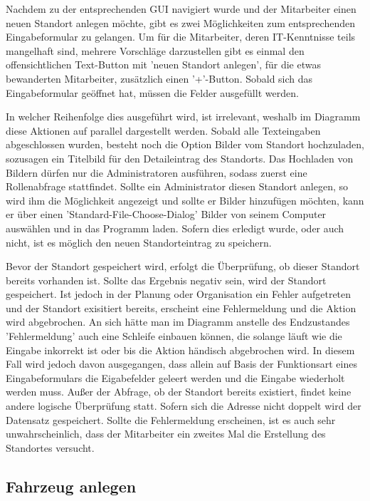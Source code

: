 Nachdem zu der entsprechenden GUI navigiert wurde und der Mitarbeiter einen neuen Standort anlegen möchte, gibt es zwei Möglichkeiten zum entsprechenden Eingabeformular zu gelangen. Um für die Mitarbeiter, deren IT-Kenntnisse teils mangelhaft sind, mehrere Vorschläge darzustellen gibt es einmal den offensichtlichen Text-Button mit 'neuen Standort anlegen', für die etwas bewanderten Mitarbeiter, zusätzlich einen '+'-Button. Sobald sich das Eingabeformular geöffnet hat, müssen die Felder ausgefüllt werden. 


In welcher Reihenfolge dies ausgeführt wird, ist irrelevant, weshalb im Diagramm diese Aktionen auf parallel dargestellt werden. Sobald alle Texteingaben abgeschlossen wurden, besteht noch die Option Bilder vom Standort hochzuladen, sozusagen ein Titelbild für den Detaileintrag des Standorts. Das Hochladen von Bildern dürfen nur die Administratoren ausführen, sodass zuerst eine Rollenabfrage stattfindet. Sollte ein Administrator diesen Standort anlegen, so wird ihm die Möglichkeit angezeigt und sollte er Bilder hinzufügen möchten, kann er über einen 'Standard-File-Choose-Dialog' Bilder von seinem Computer auswählen und in das Programm laden. Sofern dies erledigt wurde, oder auch nicht, ist es möglich den neuen Standorteintrag zu speichern. 


Bevor der Standort gespeichert wird, erfolgt die Überprüfung, ob dieser Standort bereits vorhanden ist. Sollte das Ergebnis negativ sein, wird der Standort gespeichert. Ist jedoch in der Planung oder Organisation ein Fehler aufgetreten und der Standort exisitiert bereits, erscheint eine Fehlermeldung und die Aktion wird abgebrochen. An sich hätte man im Diagramm anstelle des Endzustandes 'Fehlermeldung' auch eine Schleife einbauen können, die solange läuft wie die Eingabe inkorrekt ist oder bis die Aktion händisch abgebrochen wird. In diesem Fall wird jedoch davon ausgegangen, dass allein auf Basis der Funktionsart eines Eingabeformulars die Eigabefelder geleert werden und die Eingabe wiederholt werden muss. Außer der Abfrage, ob der Standort bereits existiert, findet keine andere logische Überprüfung statt. Sofern sich die Adresse nicht doppelt wird der Datensatz gespeichert. Sollte die Fehlermeldung erscheinen, ist es auch sehr unwahrscheinlich, dass der Mitarbeiter ein zweites Mal die Erstellung des Standortes versucht. 
\newpage

\subsection{Fahrzeug anlegen}

